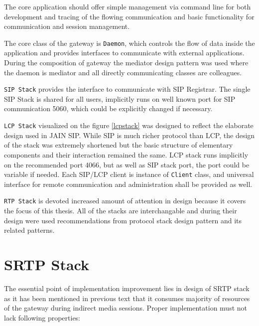 The core application should offer simple management via command line for 
both development and tracing of the flowing communication and basic 
functionality for communication and session management. 

The core class of the gateway is \texttt{Daemon}, which controls the flow of 
data inside the application and provides interfaces to communicate with external 
applications. During the composition of gateway the mediator design pattern
was used where the daemon is mediator and all directly communicating classes are
colleagues.
 
\texttt{SIP Stack} provides the interface to communicate with SIP Registrar. 
The single SIP Stack is shared for all users, implicitly runs on well known port
for SIP communication 5060, which could be explicitly changed if necessary.

\texttt{LCP Stack} visualized on the figure \ref{lcpstack} was designed to 
reflect the elaborate design used in JAIN SIP\cite{jainsip}. While SIP is much 
richer protocol than LCP, the design of the stack was extremely shortened but 
the basic structure of elementary components and their interaction remained the 
same. LCP stack runs implicitly on the recommended port 4066, but as well as SIP 
stack port, the port could be variable if needed. Each SIP/LCP client is 
instance of \texttt{Client} class, and universal interface for remote 
communication and administration shall be provided as well.

\texttt{RTP Stack} is devoted increased amount of attention in design because it 
covers the focus of this thesis. All of the stacks are interchangable and during 
their design were used recommendations from protocol stack design pattern and 
its related patterns.


\section{SRTP Stack}
The essential point of implementation improvement lies in design of SRTP stack 
as it has been mentioned in previous text that it consumes majority of resources 
of the gateway during indirect media sessions. Proper implementation must not lack following properties:

